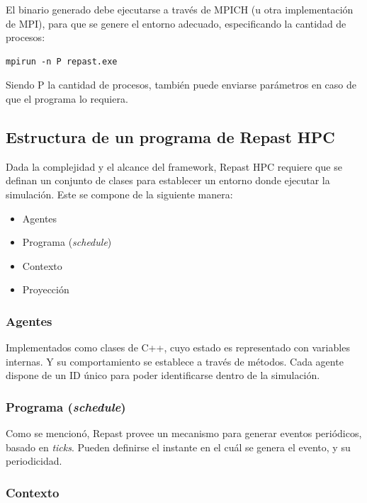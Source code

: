 El binario generado debe ejecutarse a través de MPICH (u otra
implementación de MPI), para que se genere el entorno adecuado,
especificando la cantidad de procesos:

\begin{verbatim}
mpirun -n P repast.exe
\end{verbatim}

Siendo P la cantidad de procesos, también puede enviarse parámetros en
caso de que el programa lo requiera.

\subsection{Estructura de un programa de Repast HPC}

Dada la complejidad y el alcance del framework, Repast HPC requiere que
se definan un conjunto de clases para establecer un entorno donde
ejecutar la simulación. Este se compone de la siguiente manera:

\begin{itemize}
	
	\item
	Agentes
	\item
	Programa (\emph{schedule})
	\item
	Contexto
	\item
	Proyección
\end{itemize}

\subsubsection{Agentes}

Implementados como clases de C++, cuyo estado es representado con
variables internas. Y su comportamiento se establece a través de
métodos. Cada agente dispone de un ID único para poder identificarse
dentro de la simulación.

\subsubsection{\texorpdfstring{Programa
		(\emph{schedule})}{Programa (schedule)}}

Como se mencionó, Repast provee un mecanismo para generar eventos
periódicos, basado en \emph{ticks}. Pueden definirse el instante en el
cuál se genera el evento, y su periodicidad.

\subsubsection{Contexto}

